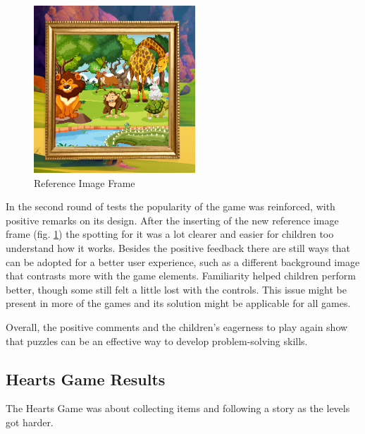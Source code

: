 \begin{figure}[!h]
    \centering
    \includegraphics[width=0.3\linewidth]{Chapters/game_changes/puzzle-game-frame.png}
    \caption{Reference Image Frame}
    \label{fig:puzzleRefImage}
\end{figure}

In the second round of tests the popularity of the game was reinforced, with positive remarks on its design. After the inserting of the new reference image frame (fig. \ref{fig:puzzleRefImage}) the spotting for it was a lot clearer and easier for children too understand how it works. Besides the positive feedback there are still ways that can be adopted for a better user experience, such as a different background image that contrasts more with the game elements.
Familiarity helped children perform better, though some still felt a little lost with the controls. This issue might be present in more of the games and its solution might be applicable for all games.

Overall, the positive comments and the children’s eagerness to play again show that puzzles can be an effective way to develop problem-solving skills.


\newpage
\subsection{Hearts Game Results}

The Hearts Game was about collecting items and following a story as the levels got harder.

